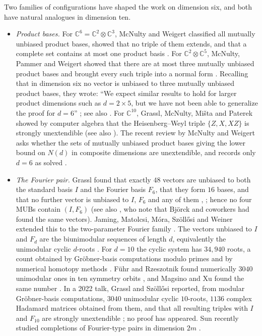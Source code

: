 \documentclass[11pt]{article}
\theoremstyle{definition}
\theoremstyle{remark}
\newcommand{\C}{\mathbb{C}}
\begin{document}
Two families of configurations have shaped the work on dimension six, and both have natural analogues in dimension ten.
\begin{itemize}[leftmargin=*]
\item \emph{Product bases.} For $\C^6=\C^2\otimes\C^3$, McNulty and Weigert classified all mutually unbiased product
  bases, showed that no triple of them extends, and that a complete set contains at most one product basis
  \cite{McNultyWeigert2012a,McNultyWeigert2012b,McNultyWeigert2012c}.
  For $\C^2\otimes\C^5$, McNulty, Pammer and Weigert showed that there are at most three mutually unbiased product
  bases and brought every such triple into a normal form \cite[Thm.~2, Cor.~3]{MPW2016}. Recalling that in dimension six
  no vector is unbiased to three mutually unbiased product bases, they wrote: ``We expect similar results to hold for
  larger product dimensions such as $d=2\times5$, but we have not been able to generalize the proof for $d=6$''
  \cite[after Cor.~6]{MPW2016}; see also \cite{WPZ2011,Cariello2021}. For $\C^{10}$, Grassl, McNulty, Mi\v{s}ta and Paterek showed
  by computer algebra that the Heisenberg--Weyl triple $\{Z,X,XZ\}$ is strongly unextendible \cite{GMMP2017}
  (see also \cite{MBGW2014}). The recent review by McNulty and Weigert asks whether the sets of mutually unbiased product bases
  giving the lower bound on $N(d)$ in composite dimensions are unextendible, and records only $d=6$ as solved
  \cite[Problem~10.8]{MW2026}.
\item \emph{The Fourier pair.} Grassl found that exactly $48$ vectors are unbiased to both the standard basis $I$ and the
  Fourier basis $F_6$, that they form $16$ bases, and that no further vector is unbiased to $I$, $F_6$ and any of them
  \cite{Grassl2004}, \cite[Thm.~7.6]{MW2026}; hence no four MUBs contain $(I,F_6)$ (see also \cite{BBELTZ2007}, who
  note that Bj\"orck and coworkers had found the same vectors). Jaming, Matolcsi, M\'ora, Sz\"oll\H{o}si and Weiner
  extended this to the two-parameter Fourier family \cite{JMMSW2009}. The vectors unbiased
  to $I$ and $F_d$ are the biunimodular sequences of length $d$, equivalently the unimodular cyclic $d$-roots
  \cite{Bjorck1990,BjorckFroberg1991,Haagerup2008,FuhrRzeszotnik2015}. For $d=10$ the cyclic system has $34{,}940$ roots, a count
  obtained by Gröbner-basis computations modulo primes and by numerical homotopy methods
  \cite{Faugere2002,FaugereSvartz2013,SteelMagma,SVW2001}. F\"uhr and Rzeszotnik found numerically $3040$ unimodular
  ones in ten symmetry orbits \cite{FuhrRzeszotnik2015}, and Magsino and Xu found the same number \cite{MagsinoXu2023}.
  In a 2022 talk, Grassl and Sz\"oll\H{o}si reported, from modular Gr\"obner-basis computations, $3040$ unimodular
  cyclic $10$-roots, $1136$ complex Hadamard matrices obtained from them, and that all resulting triples with $I$ and
  $F_{10}$ are strongly unextendible \cite{GrasslSzollosi2022}; no proof has appeared. Sun recently studied
  completions of Fourier-type pairs in dimension $2m$ \cite{Sun2026}.
\end{itemize}
\end{document}
